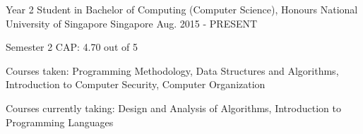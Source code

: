 

\begin{cventries}

	\cventry
	{Year 2 Student in Bachelor of Computing (Computer Science), Honours} %
	{National University of Singapore} %
	{Singapore} %
	{Aug. 2015 - PRESENT} %
	{
		\begin{cvitems} %
		\item {Semester 2 CAP: 4.70 out of 5}
		\item {Courses taken: Programming Methodology, Data Structures and Algorithms, Introduction to Computer Security, Computer Organization}
		\item {Courses currently taking: Design and Analysis of Algorithms, Introduction to Programming Languages}
		\end{cvitems}
	}

\end{cventries}
